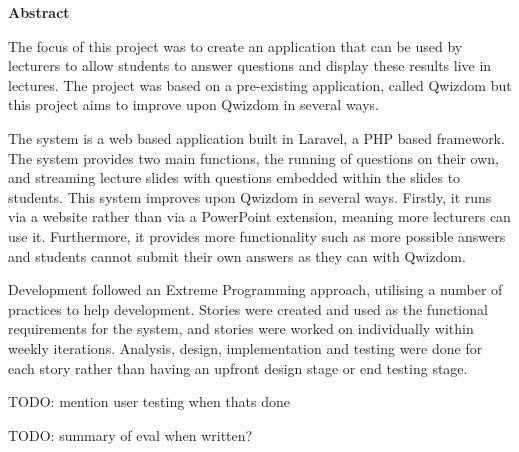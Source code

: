 \thispagestyle{empty}

\begin{center}
    {\LARGE\bf Abstract}
\end{center}

The focus of this project was to create an application that can be used by lecturers to allow students to answer questions and display these results live in lectures. The project was based on a pre-existing application, called Qwizdom\cite{Qwizdom} but this project aims to improve upon Qwizdom in several ways.

The system is a web based application built in Laravel, a PHP based framework. The system provides two main functions, the running of questions on their own, and streaming lecture slides with questions embedded within the slides to students. This system improves upon Qwizdom in several ways. Firstly, it runs via a website rather than via a PowerPoint extension, meaning more lecturers can use it. Furthermore, it provides more functionality such as more possible answers and students cannot submit their own answers as they can with Qwizdom.

Development followed an Extreme Programming approach, utilising a number of practices to help development. Stories were created and used as the functional requirements for the system, and stories were worked on individually within weekly iterations. Analysis, design, implementation and testing were done for each story rather than having an upfront design stage or end testing stage.

TODO: mention user testing when thats done

TODO: summary of eval when written?